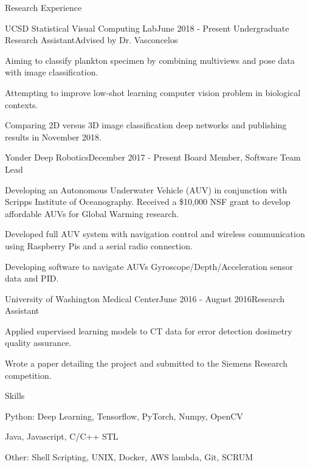 \documentclass{resume} %
\begin{document}
\begin{rSection}{Research Experience}

\begin{rSubsection}{UCSD Statistical Visual Computing Lab}{June 2018 - Present}{
Undergraduate Research Assistant}{Advised by Dr. Vasconcelos}
\item Aiming to classify plankton specimen by combining multiviews and pose data with image classification.
\item Attempting to improve low-shot learning computer vision problem in biological contexts.
\item Comparing 2D versus 3D image classification deep networks and publishing results in November 2018.
\end{rSubsection}

\begin{rSubsection}{Yonder Deep Robotics}{December 2017 - Present}{
Board Member, Software Team Lead}{}
\item Developing an Autonomous Underwater Vehicle (AUV) in conjunction with Scripps Institute of Oceanography. Received a \$10,000 NSF grant to develop affordable AUVs for Global Warming research.
\item Developed full AUV system with navigation control and wireless communication using Raspberry Pis and a serial radio connection.
\item Developing software to navigate AUVs Gyroscope/Depth/Acceleration sensor data and PID.
\end{rSubsection}


\begin{rSubsection}{University of Washington Medical Center}{June 2016 - August 2016}{Research Assistant}{}
\item Applied supervised learning models to CT data for error detection dosimetry quality assurance.
\item Wrote a paper detailing the project and submitted to the Siemens Research competition.
\end{rSubsection}

\end{rSection}

\begin{rSection}{Skills}
\item Python: Deep Learning, Tensorflow, PyTorch, Numpy, OpenCV
\item Java, Javascript, C/C++ STL
\item Other: Shell Scripting, UNIX, Docker, AWS lambda, Git, SCRUM

\end{rSection}
\end{document}

